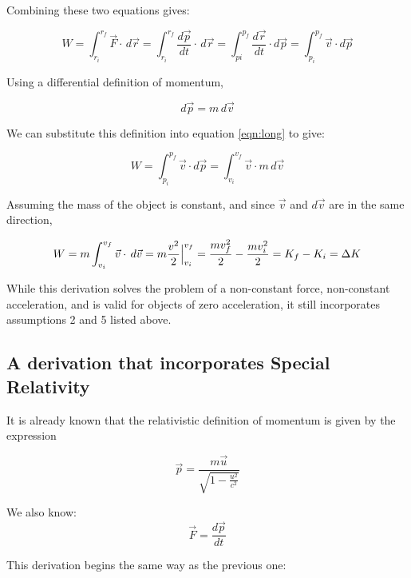 \documentclass[letterpaper, 12pt]{article}
\begin{document}
Combining these two equations gives: 

\begin{equation}
	W = \int_{r_i}^{r_f} \vec{F} \cdot \,d\vec{r} = \int_{r_i}^{r_f} \frac{d\vec{p}}{dt} \cdot \,d\vec{r} = \int_{pi}^{p_f}  \frac{d\vec{r}}{dt} \cdot d\vec{p} = \int_{p_i}^{p_f} \vec{v} \cdot d\vec{p}  
	\label{eqn:long}
\end{equation}

Using a differential definition of momentum,

\begin{equation}
	d\vec{p} = m \, d\vec{v} 
\end{equation}

We can substitute this definition into equation \ref{eqn:long} to give: 

\begin{equation}
	W = \int_{p_i}^{p_f} \vec{v} \cdot d\vec{p}  = \int_{v_i}^{v_f} \vec{v} \cdot m \, d\vec{v}   
\end{equation}

Assuming the mass of the object is constant, and since $\vec{v}$ and $d\vec{v} $ are in the same direction,  

\begin{equation}
	W = m \int_{v_i}^{v_f} \vec{v} \cdot \, d\vec{v}  = m \frac{v^2}{2} \Big {|}_{v_i}^{v_f} = \frac{mv_f^2}{2} - \frac{mv_i^2}{2} = K_f - K_i = \Delta K
\end{equation}

While this derivation solves the problem of a non-constant force, non-constant acceleration, and is valid for objects of zero acceleration, it still incorporates assumptions 2 and 5 listed above.  


\subsection{A derivation that incorporates Special Relativity}
It is already known that the relativistic definition of momentum is given by the expression

\begin{equation}
	\vec{p} = \frac{m \vec{u}}{\sqrt{1-\frac{u^2}{c^2}}} 
	\label{eqn:relmomentum}
\end{equation}

We also know:
\begin{equation}
	\vec{F} = \frac{d\vec{p}}{dt}
\end{equation}

This derivation begins the same way as the previous one:
\end{document}
